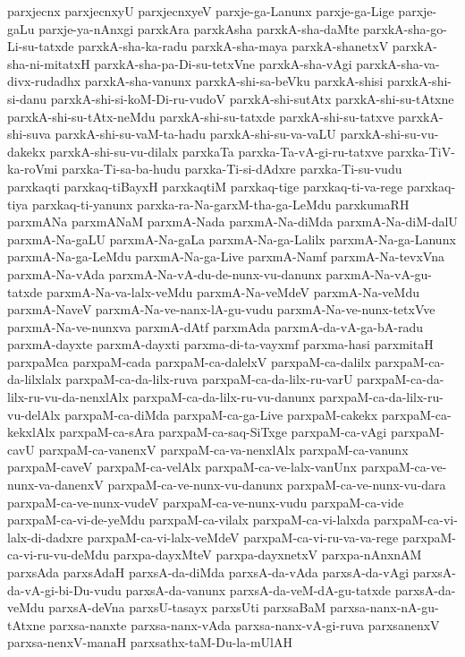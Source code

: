 {parxjecnx
parxjecnxyU
parxjecnxyeV
parxje-ga-Lanunx
parxje-ga-Lige
parxje-gaLu
parxje-ya-nAnxgi
parxkAra
parxkAsha
parxkA-sha-daMte
parxkA-sha-go-Li-su-tatxde
parxkA-sha-ka-radu
parxkA-sha-maya
parxkA-shanetxV
parxkA-sha-ni-mitatxH
parxkA-sha-pa-Di-su-tetxVne
parxkA-sha-vAgi
parxkA-sha-va-divx-rudadhx
parxkA-sha-vanunx
parxkA-shi-sa-beVku
parxkA-shisi
parxkA-shi-si-danu
parxkA-shi-si-koM-Di-ru-vudoV
parxkA-shi-sutAtx
parxkA-shi-su-tAtxne
parxkA-shi-su-tAtx-neMdu
parxkA-shi-su-tatxde
parxkA-shi-su-tatxve
parxkA-shi-suva
parxkA-shi-su-vaM-ta-hadu
parxkA-shi-su-va-vaLU
parxkA-shi-su-vu-dakekx
parxkA-shi-su-vu-dilalx
parxkaTa
parxka-Ta-vA-gi-ru-tatxve
parxka-TiV-ka-roVmi
parxka-Ti-sa-ba-hudu
parxka-Ti-si-dAdxre
parxka-Ti-su-vudu
parxkaqti
parxkaq-tiBayxH
parxkaqtiM
parxkaq-tige
parxkaq-ti-va-rege
parxkaq-tiya
parxkaq-ti-yanunx
parxka-ra-Na-garxM-tha-ga-LeMdu
parxkumaRH
parxmANa
parxmANaM
parxmA-Nada
parxmA-Na-diMda
parxmA-Na-diM-dalU
parxmA-Na-gaLU
parxmA-Na-gaLa
parxmA-Na-ga-Lalilx
parxmA-Na-ga-Lanunx
parxmA-Na-ga-LeMdu
parxmA-Na-ga-Live
parxmA-Namf
parxmA-Na-tevxVna
parxmA-Na-vAda
parxmA-Na-vA-du-de-nunx-vu-danunx
parxmA-Na-vA-gu-tatxde
parxmA-Na-va-lalx-veMdu
parxmA-Na-veMdeV
parxmA-Na-veMdu
parxmA-NaveV
parxmA-Na-ve-nanx-lA-gu-vudu
parxmA-Na-ve-nunx-tetxVve
parxmA-Na-ve-nunxva
parxmA-dAtf
parxmAda
parxmA-da-vA-ga-bA-radu
parxmA-dayxte
parxmA-dayxti
parxma-di-ta-vayxmf
parxma-hasi
parxmitaH
parxpaMca
parxpaM-cada
parxpaM-ca-dalelxV
parxpaM-ca-dalilx
parxpaM-ca-da-lilxlalx
parxpaM-ca-da-lilx-ruva
parxpaM-ca-da-lilx-ru-varU
parxpaM-ca-da-lilx-ru-vu-da-nenxlAlx
parxpaM-ca-da-lilx-ru-vu-danunx
parxpaM-ca-da-lilx-ru-vu-delAlx
parxpaM-ca-diMda
parxpaM-ca-ga-Live
parxpaM-cakekx
parxpaM-ca-kekxlAlx
parxpaM-ca-sAra
parxpaM-ca-saq-SiTxge
parxpaM-ca-vAgi
parxpaM-cavU
parxpaM-ca-vanenxV
parxpaM-ca-va-nenxlAlx
parxpaM-ca-vanunx
parxpaM-caveV
parxpaM-ca-velAlx
parxpaM-ca-ve-lalx-vanUnx
parxpaM-ca-ve-nunx-va-danenxV
parxpaM-ca-ve-nunx-vu-danunx
parxpaM-ca-ve-nunx-vu-dara
parxpaM-ca-ve-nunx-vudeV
parxpaM-ca-ve-nunx-vudu
parxpaM-ca-vide
parxpaM-ca-vi-de-yeMdu
parxpaM-ca-vilalx
parxpaM-ca-vi-lalxda
parxpaM-ca-vi-lalx-di-dadxre
parxpaM-ca-vi-lalx-veMdeV
parxpaM-ca-vi-ru-va-va-rege
parxpaM-ca-vi-ru-vu-deMdu
parxpa-dayxMteV
parxpa-dayxnetxV
parxpa-nAnxnAM
parxsAda
parxsAdaH
parxsA-da-diMda
parxsA-da-vAda
parxsA-da-vAgi
parxsA-da-vA-gi-bi-Du-vudu
parxsA-da-vanunx
parxsA-da-veM-dA-gu-tatxde
parxsA-da-veMdu
parxsA-deVna
parxsU-tasayx
parxsUti
parxsaBaM
parxsa-nanx-nA-gu-tAtxne
parxsa-nanxte
parxsa-nanx-vAda
parxsa-nanx-vA-gi-ruva
parxsanenxV
parxsa-nenxV-manaH
parxsathx-taM-Du-la-mUlAH
}
